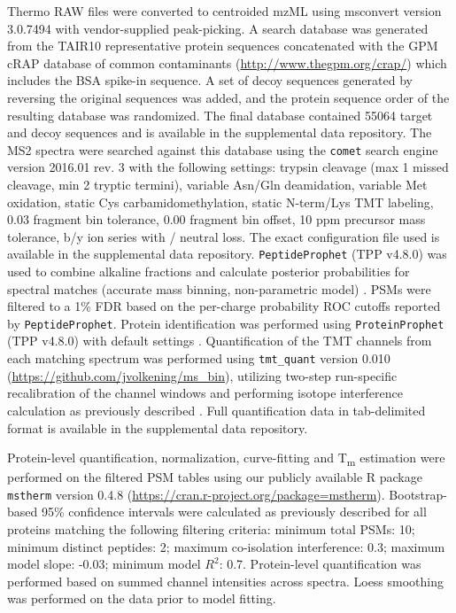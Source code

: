 \documentclass[11pt,letter]{article}\usepackage[]{graphicx}\usepackage[]{color}
\newcommand{\Tm}{T\textsubscript{m}}
\newcommand{\sw}[1]{\texttt{#1}}
\begin{document}
Thermo RAW files were converted to centroided mzML using msconvert
\cite{chambers_cross-platform_2012} version 3.0.7494 with vendor-supplied
peak-picking. A search database was generated from the TAIR10 representative
protein sequences concatenated with the GPM cRAP database of common
contaminants (\url{http://www.thegpm.org/crap/}) which includes the BSA
spike-in sequence. A set of decoy sequences generated by reversing the
original sequences was added, and the protein sequence order of the resulting
database was randomized. The final database contained
55064 target and decoy sequences and is available in the
supplemental data repository. The MS2 spectra were searched against this
database using the \sw{comet} search engine \cite{eng_comet:_2013} version
2016.01 rev. 3 with the following settings: trypsin cleavage (max 1 missed
cleavage, min 2 tryptic termini), variable Asn/Gln deamidation, variable Met
oxidation, static Cys carbamidomethylation, static N-term/Lys TMT labeling,
0.03 fragment bin tolerance, 0.00 fragment bin offset, 10 ppm precursor mass
tolerance, b/y ion series with / neutral loss. The exact
configuration file used is available in the supplemental data repository.
\sw{PeptideProphet} (TPP v4.8.0) was used to combine alkaline fractions and
calculate posterior probabilities for spectral matches (accurate mass binning,
non-parametric model) \cite{ma_statistical_2012}. PSMs were filtered to a 1\%
FDR based on the per-charge probability ROC cutoffs reported by
\sw{PeptideProphet}. Protein identification was performed using
\sw{ProteinProphet} (TPP v4.8.0) with default settings
\cite{nesvizhskii_statistical_2003}. Quantification of the TMT channels from
each matching spectrum was performed using \sw{tmt\_quant} version 0.010
(\url{https://github.com/jvolkening/ms_bin}), utilizing two-step run-specific
recalibration of the channel windows and performing isotope interference
calculation as previously described \cite{savitski_measuring_2013}. Full
quantification data in tab-delimited format is available in the supplemental
data repository.

Protein-level quantification, normalization, curve-fitting and \Tm{}
estimation were performed on the filtered PSM tables using our publicly
available R package \sw{mstherm} version 0.4.8
(\url{https://cran.r-project.org/package=mstherm}). Bootstrap-based 95\%
confidence intervals were calculated as previously described
\cite{savitski_tracking_2014} for all proteins matching the following
filtering criteria: minimum total PSMs: 10; minimum distinct
peptides: 2; maximum co-isolation interference: 0.3;
maximum model slope: -0.03; minimum model $R^2$: 0.7.
Protein-level quantification was performed based on summed channel intensities
across spectra. Loess smoothing was performed on the data prior to model
fitting.
\end{document}
